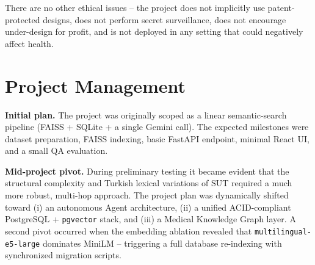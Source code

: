 \documentclass[11pt, a4paper]{article}
\begin{document}
\begin{itemize}[leftmargin=*]
There are no other ethical issues -- the project does not implicitly use patent-protected designs, does not perform secret surveillance, does not encourage under-design for profit, and is not deployed in any setting that could negatively affect health.

\section{Project Management}

\textbf{Initial plan.} The project was originally scoped as a linear semantic-search pipeline (FAISS + SQLite + a single Gemini call). The expected milestones were dataset preparation, FAISS indexing, basic FastAPI endpoint, minimal React UI, and a small QA evaluation.

\textbf{Mid-project pivot.} During preliminary testing it became evident that the structural complexity and Turkish lexical variations of SUT required a much more robust, multi-hop approach. The project plan was dynamically shifted toward (i) an autonomous Agent architecture, (ii) a unified ACID-compliant PostgreSQL + \texttt{pgvector} stack, and (iii) a Medical Knowledge Graph layer. A second pivot occurred when the embedding ablation revealed that \texttt{multilingual-e5-large} dominates MiniLM -- triggering a full database re-indexing with synchronized migration scripts.


\end{itemize}
\end{document}
